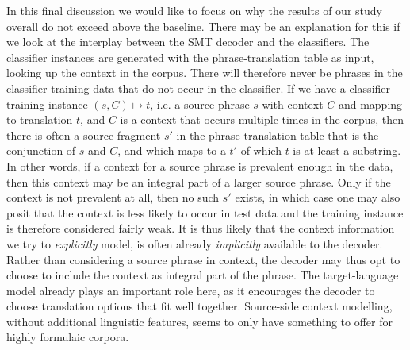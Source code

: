 \documentclass[smallextended]{svjour3}       %
\theoremstyle{break}
\begin{document}
In this final discussion we would like to focus on why the results of our study
overall do not exceed above the baseline.  There may be an explanation for this
if we look at the interplay between the SMT decoder and the classifiers. The
classifier instances are generated with the phrase-translation table as input,
looking up the context in the corpus. There will therefore never be phrases in
the classifier training data that do not occur in the classifier. If we have a
classifier training instance $(s,C) \mapsto t$, i.e.  a source phrase $s$ with
context $C$ and mapping to translation $t$, and $C$ is a context that occurs
multiple times in the corpus, then there is often a source fragment $s'$ in the
phrase-translation table that is the conjunction of $s$ and $C$, and which maps
to a $t'$ of which $t$ is at least a substring. In other words, if a context
for a source phrase is prevalent enough in the data, then this context may be
an integral part of a larger source phrase. Only if the context is not
prevalent at all, then no such $s'$ exists, in which case one may also posit
that the context is less likely to occur in test data and the training instance
is therefore considered fairly weak.  It is thus likely that the context
information we try to \emph{explicitly} model, is often already
\emph{implicitly} available to the decoder.  Rather than considering a source
phrase in context, the decoder may thus opt to choose to include the context as
integral part of the phrase.  The target-language model already plays an
important role here, as it encourages the decoder to choose translation options
that fit well together. Source-side context modelling, without additional
linguistic features, seems to only have something to offer for highly formulaic
corpora. 




\end{document}
